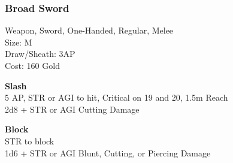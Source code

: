 \subsubsection{Broad Sword}\label{weapon:broadSword}
Weapon, Sword, One-Handed, Regular, Melee\\
Size: M\\
Draw/Sheath: 3AP\\
Cost: 160 Gold

\textbf{Slash}\\
5 AP, STR or AGI to hit, Critical on 19 and 20, 1.5m Reach\\
2d8 + \texttimes STR or AGI Cutting Damage

\textbf{Block}\\
STR to block\\
1d6 + \texttimes STR or AGI Blunt, Cutting, or Piercing Damage

